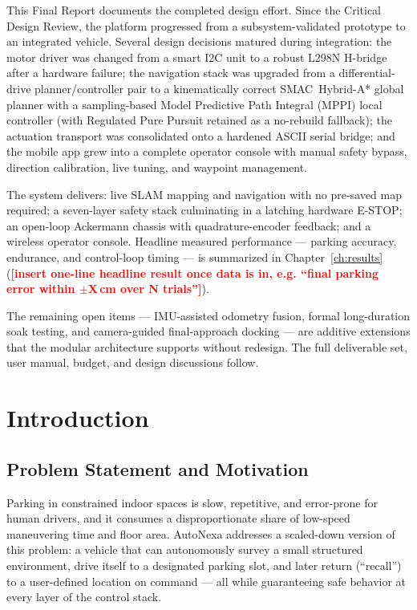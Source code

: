 \documentclass[12pt,a4paper]{report}
\newcommand{\pname}{AutoNexa}
\newcommand{\TODO}[1]{\textcolor{red}{\textbf{[#1]}}}
\begin{document}
This Final Report documents the completed design effort. Since the Critical
Design Review, the platform progressed from a subsystem-validated prototype to an
integrated vehicle. Several design decisions matured during integration: the
motor driver was changed from a smart I2C unit to a robust L298N H-bridge after a
hardware failure; the navigation stack was upgraded from a differential-drive
planner/controller pair to a kinematically correct \mbox{SMAC Hybrid-A*} global
planner with a sampling-based Model Predictive Path Integral (MPPI) local
controller (with Regulated Pure Pursuit retained as a no-rebuild fallback); the
actuation transport was consolidated onto a hardened ASCII serial bridge; and the
mobile app grew into a complete operator console with manual safety bypass,
direction calibration, live tuning, and waypoint management.

The system delivers: live SLAM mapping and navigation with no pre-saved map
required; a seven-layer safety stack culminating in a latching hardware E-STOP;
an open-loop Ackermann chassis with quadrature-encoder feedback; and a wireless
operator console. Headline measured performance ---
parking accuracy, endurance, and control-loop timing --- is summarized in
Chapter~\ref{ch:results} (\TODO{insert one-line headline result once data is in,
e.g. ``final parking error within $\pm$X\,cm over N trials''}).

The remaining open items --- IMU-assisted odometry fusion, formal long-duration
soak testing, and camera-guided final-approach docking --- are additive
extensions that the modular architecture supports without redesign. The full
deliverable set, user manual, budget, and design discussions follow.

\chapter{Introduction}

\section{Problem Statement and Motivation}

Parking in constrained indoor spaces is slow, repetitive, and error-prone for
human drivers, and it consumes a disproportionate share of low-speed maneuvering
time and floor area. \pname{} addresses a scaled-down version of this problem: a
vehicle that can autonomously survey a small structured environment, drive itself
to a designated parking slot, and later return (``recall'') to a user-defined
location on command --- all while guaranteeing safe behavior at every layer of
the control stack.
\end{document}
